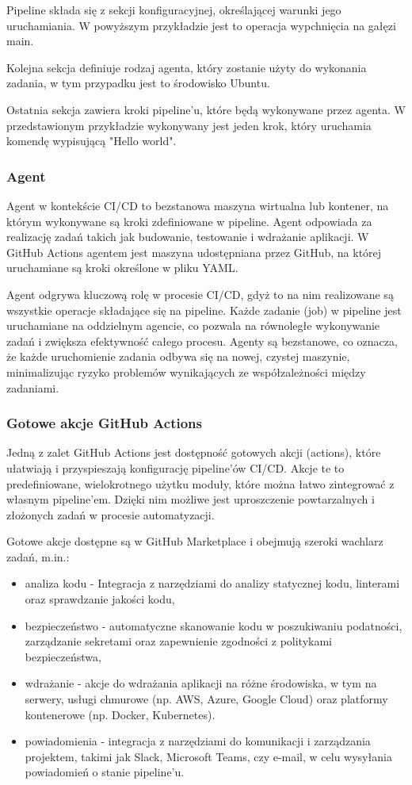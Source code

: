 \documentclass{article}
\begin{document}
Pipeline składa się z sekcji konfiguracyjnej, określającej warunki jego uruchamiania. W powyższym przykładzie jest to operacja wypchnięcia na gałęzi main.

Kolejna sekcja definiuje rodzaj agenta, który zostanie użyty do wykonania zadania, w tym przypadku jest to środowisko Ubuntu.

Ostatnia sekcja zawiera kroki pipeline’u, które będą wykonywane przez agenta. W przedstawionym przykładzie wykonywany jest jeden krok, który uruchamia komendę wypisującą "Hello world".

\subsubsection{Agent}

Agent w kontekście CI/CD to bezstanowa maszyna wirtualna lub kontener, na którym wykonywane są kroki zdefiniowane w pipeline. Agent odpowiada za realizację zadań takich jak budowanie, testowanie i wdrażanie aplikacji. W GitHub Actions agentem jest maszyna udostępniana przez GitHub, na której uruchamiane są kroki określone w pliku YAML.

Agent odgrywa kluczową rolę w procesie CI/CD, gdyż to na nim realizowane są wszystkie operacje składające się na pipeline. Każde zadanie (job) w pipeline jest uruchamiane na oddzielnym agencie, co pozwala na równoległe wykonywanie zadań i zwiększa efektywność całego procesu. Agenty są bezstanowe, co oznacza, że każde uruchomienie zadania odbywa się na nowej, czystej maszynie, minimalizując ryzyko problemów wynikających ze współzależności między zadaniami.

\subsubsection{Gotowe akcje GitHub Actions}

Jedną z zalet GitHub Actions jest dostępność gotowych akcji (actions), które ułatwiają i przyspieszają konfigurację pipeline'ów CI/CD. Akcje te to predefiniowane, wielokrotnego użytku moduły, które można łatwo zintegrować z własnym pipeline’em. Dzięki nim możliwe jest uproszczenie powtarzalnych i złożonych zadań w procesie automatyzacji.

Gotowe akcje dostępne są w GitHub Marketplace i obejmują szeroki wachlarz zadań, m.in.:

\begin{itemize}
\item analiza kodu - Integracja z narzędziami do analizy statycznej kodu, linterami oraz sprawdzanie jakości kodu,
\item bezpieczeństwo - automatyczne skanowanie kodu w poszukiwaniu podatności, zarządzanie sekretami oraz zapewnienie zgodności z politykami bezpieczeństwa,
\item wdrażanie - akcje do wdrażania aplikacji na różne środowiska, w tym na serwery, usługi chmurowe (np. AWS, Azure, Google Cloud) oraz platformy kontenerowe (np. Docker, Kubernetes).
\item powiadomienia - integracja z narzędziami do komunikacji i zarządzania projektem, takimi jak Slack, Microsoft Teams, czy e-mail, w celu wysyłania powiadomień o stanie pipeline'u.
\end{itemize}
\end{document}

